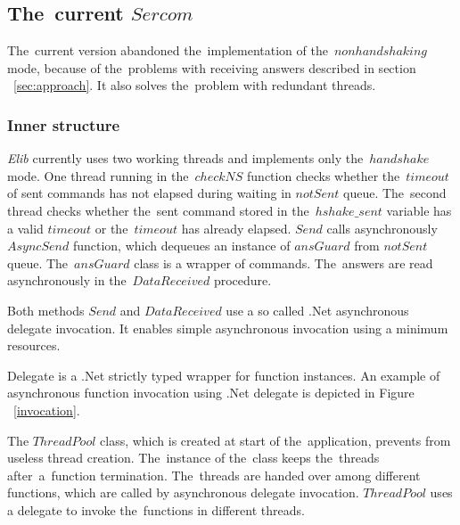 %
%

\subsection*{The~current $Sercom$}\label{sec:current}
  The~current version abandoned the~implementation of the~$nonhandshaking$ mode, 
  because of the~problems with receiving answers described 
  in section ~\ref{sec:approach}.
  It also solves the~problem with	redundant threads. 

  \subsubsection*{Inner structure} %
  {\it Elib} currently uses two working threads and implements only the~$handshake$ mode.
  One thread running in the~$checkNS$ function checks whether the~$timeout$ of sent commands
  has not elapsed during waiting in $notSent$ queue. The~second thread checks whether the~sent command
  stored in the~$hshake\_sent$ variable has a valid $timeout$ or the~$timeout$ has already elapsed.
  $Send$ calls asynchronously $AsyncSend$ function, which dequeues an instance of $ansGuard$ from $notSent$ queue.
  The~$ansGuard$ class is a wrapper of commands.
  The~answers are read asynchronously in the~$DataReceived$ procedure.
  \begin{remark}
  Both methods $Send$ and $DataReceived$ use a so called .Net asynchronous
  delegate invocation. It enables simple asynchronous invocation using a minimum resources.
  \end{remark}
  \begin{definition}[Delegate]
  Delegate\cite{delegate} is a .Net strictly typed wrapper for function instances.
  An example of asynchronous function invocation using .Net delegate is depicted in Figure ~\ref{invocation}.
  \end{definition}
  \begin{remark}
  The $ThreadPool$ class, which is created at 
  start of the~application, prevents from useless thread creation. 
  The~instance of the~class keeps the~threads after~a~function termination.
  The~threads are handed over among different functions, which are called 
  by asynchronous delegate invocation.
  $ThreadPool$ uses a delegate to invoke the~functions in different threads.
  \end{remark}
  

